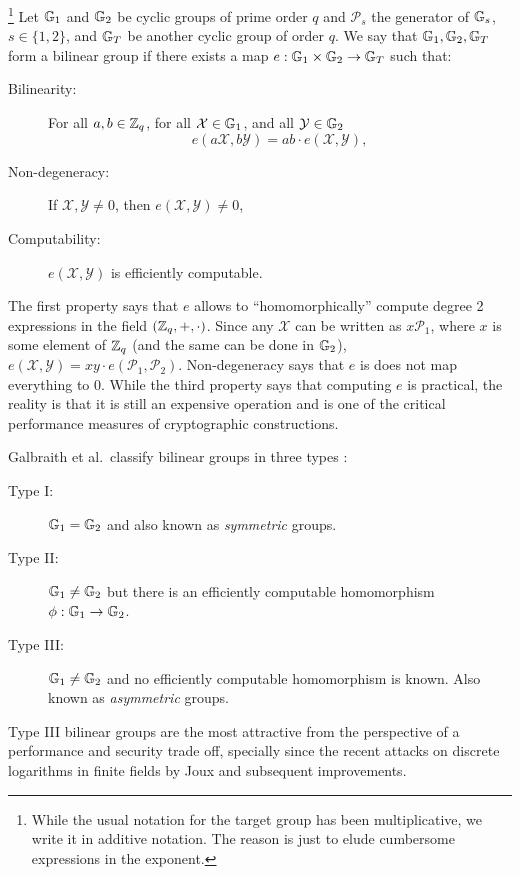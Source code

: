 \begin{definition} \footnote{While the usual notation for the target group has been multiplicative, we write it in additive notation. The reason is just to elude cumbersome expressions in the exponent.}
Let $\mathbb{G}_1$ and $\mathbb{G}_2$ be cyclic groups of prime order $q$ and $\mathcal{P}_s$ the generator of $\mathbb{G}_s$, $s\in\{1,2\}$, and $\mathbb{G}_T$ be another cyclic group of order $q$. We say that $\mathbb{G}_1,\mathbb{G}_2,\mathbb{G}_T$ form a bilinear group if there exists a map $e:\mathbb{G}_1\times\mathbb{G}_2\to\mathbb{G}_T$ such that:
\begin{description}
\item[Bilinearity:] For all $a,b\in\mathbb{Z}_q$, for all $\mathcal{X}\in\mathbb{G}_1$, and all $\mathcal{Y}\in\mathbb{G}_2$
$$
e(a\mathcal{X},b\mathcal{Y})=ab\cdot e(\mathcal{X},\mathcal{Y}),
$$
\item[Non-degeneracy:] If $\mathcal{X},\mathcal{Y}\neq0$, then $e(\mathcal{X},\mathcal{Y})\neq 0$,
\item[Computability:] $e(\mathcal{X},\mathcal{Y})$ is efficiently computable.
\end{description} 
\end{definition} 

The first property says that $e$ allows to ``homomorphically'' compute degree 2 expressions in the field $(\mathbb{Z}_q,+,\cdot)$. Since any $\mathcal{X}$ can be written as $x\mathcal{P}_1$, where $x$ is some element of $\mathbb{Z}_q$ (and the same can be done in $\mathbb{G}_2$), $e(\mathcal{X},\mathcal{Y})=xy\cdot e(\mathcal{P}_1,\mathcal{P}_2)$. Non-degeneracy says that $e$ is does not map everything to 0. While the third property says that computing $e$ is practical, the reality is that it is still an expensive operation and is one of the critical performance measures of cryptographic constructions.

Galbraith et al.~classify bilinear groups in three types \cite{DAM:GalPatSma08}:

\begin{description}
\item[Type I:] $\mathbb{G}_1=\mathbb{G}_2$ and also known as \emph{symmetric} groups. 
\item[Type II:] $\mathbb{G}_1\neq\mathbb{G}_2$ but there is an efficiently computable homomorphism $\phi:\mathbb{G}_1\to\mathbb{G}_2$.
\item[Type III:] $\mathbb{G}_1\neq\mathbb{G}_2$ and no efficiently computable homomorphism is known. Also known as \emph{asymmetric} groups.
\end{description}

Type III bilinear groups are the most attractive from the perspective
of a performance and security trade off, specially since the recent attacks on discrete logarithms in
finite fields by Joux \cite{SAC:Joux13} and subsequent improvements.

